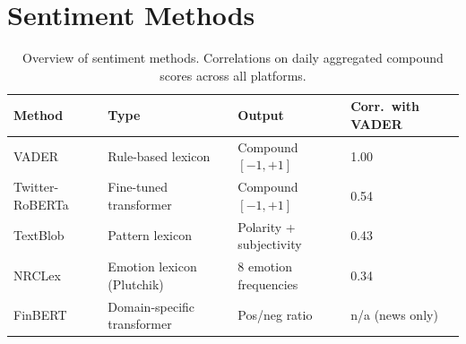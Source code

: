\newpage
\section{Sentiment Methods}
\label{app:sentiment}

\begin{table}[ht]
\centering
\small
\begin{tabular}{p{3.5cm} p{3.8cm} p{3.0cm} p{2.8cm}}
\toprule
\textbf{Method} & \textbf{Type} & \textbf{Output} & \textbf{Corr.\ with VADER} \\
\midrule
VADER              & Rule-based lexicon           & Compound $[-1, +1]$     & 1.00 \\
Twitter-RoBERTa    & Fine-tuned transformer       & Compound $[-1, +1]$     & 0.54 \\
TextBlob           & Pattern lexicon              & Polarity + subjectivity & 0.43 \\
NRCLex             & Emotion lexicon (Plutchik)   & 8 emotion frequencies   & 0.34 \\
FinBERT            & Domain-specific transformer  & Pos/neg ratio           & n/a (news only) \\
\bottomrule
\end{tabular}
\caption{Overview of sentiment methods. Correlations on daily aggregated compound scores across all platforms.}
\label{tab:sentiment}
\end{table}
